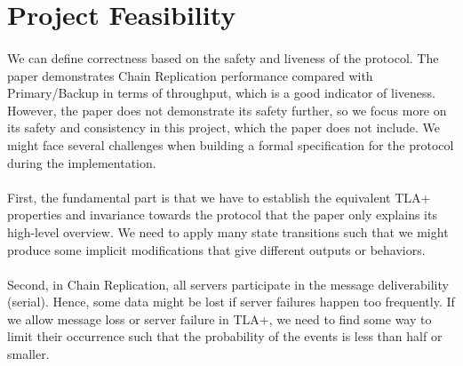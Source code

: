 \section{Project Feasibility}
\setcounter{subsection}{0}
\renewcommand*{\thesubsection}{\Alph{subsection}.}

\paragraph{}
We can define correctness based on the safety and liveness of the protocol. The paper demonstrates Chain Replication performance compared with Primary/Backup in terms of throughput, which is a
good indicator of liveness. However, the paper does not demonstrate its safety further, so we focus more on its safety and consistency in this project, which the paper does not include. We might face several challenges when building a formal specification for the protocol during the implementation.

\paragraph{}
First, the fundamental part is that we have to establish the equivalent TLA+ properties and invariance towards the protocol that the paper only explains its high-level overview. We need to apply many state transitions such that we might produce some implicit modifications that give different outputs or behaviors.

\paragraph{}
Second, in Chain Replication, all servers participate in the message deliverability (serial). Hence, some data might be lost if server failures happen too frequently. If we allow message loss or server failure in TLA+, we need to find some way to limit their occurrence such that the probability of the events is less than half or smaller.